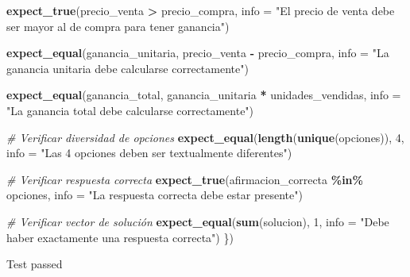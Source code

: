\documentclass[
]{article}
\newenvironment{Shaded}{\begin{snugshade}}{\end{snugshade}}
\newcommand{\AttributeTok}[1]{\textcolor[rgb]{0.13,0.29,0.53}{#1}}
\newcommand{\CommentTok}[1]{\textcolor[rgb]{0.56,0.35,0.01}{\textit{#1}}}
\newcommand{\DecValTok}[1]{\textcolor[rgb]{0.00,0.00,0.81}{#1}}
\newcommand{\FunctionTok}[1]{\textcolor[rgb]{0.13,0.29,0.53}{\textbf{#1}}}
\newcommand{\NormalTok}[1]{#1}
\newcommand{\SpecialCharTok}[1]{\textcolor[rgb]{0.81,0.36,0.00}{\textbf{#1}}}
\newcommand{\StringTok}[1]{\textcolor[rgb]{0.31,0.60,0.02}{#1}}
\begin{document}
\begin{Shaded}
\begin{Highlighting}[]
  \FunctionTok{expect\_true}\NormalTok{(precio\_venta }\SpecialCharTok{\textgreater{}}\NormalTok{ precio\_compra,}
              \AttributeTok{info =} \StringTok{"El precio de venta debe ser mayor al de compra para tener ganancia"}\NormalTok{)}

  \FunctionTok{expect\_equal}\NormalTok{(ganancia\_unitaria, precio\_venta }\SpecialCharTok{{-}}\NormalTok{ precio\_compra,}
              \AttributeTok{info =} \StringTok{"La ganancia unitaria debe calcularse correctamente"}\NormalTok{)}

  \FunctionTok{expect\_equal}\NormalTok{(ganancia\_total, ganancia\_unitaria }\SpecialCharTok{*}\NormalTok{ unidades\_vendidas,}
              \AttributeTok{info =} \StringTok{"La ganancia total debe calcularse correctamente"}\NormalTok{)}

  \CommentTok{\# Verificar diversidad de opciones}
  \FunctionTok{expect\_equal}\NormalTok{(}\FunctionTok{length}\NormalTok{(}\FunctionTok{unique}\NormalTok{(opciones)), }\DecValTok{4}\NormalTok{,}
               \AttributeTok{info =} \StringTok{"Las 4 opciones deben ser textualmente diferentes"}\NormalTok{)}

  \CommentTok{\# Verificar respuesta correcta}
  \FunctionTok{expect\_true}\NormalTok{(afirmacion\_correcta }\SpecialCharTok{\%in\%}\NormalTok{ opciones,}
              \AttributeTok{info =} \StringTok{"La respuesta correcta debe estar presente"}\NormalTok{)}

  \CommentTok{\# Verificar vector de solución}
  \FunctionTok{expect\_equal}\NormalTok{(}\FunctionTok{sum}\NormalTok{(solucion), }\DecValTok{1}\NormalTok{,}
              \AttributeTok{info =} \StringTok{"Debe haber exactamente una respuesta correcta"}\NormalTok{)}
\NormalTok{\})}
\end{Highlighting}
\end{Shaded}

Test passed
\end{document}
